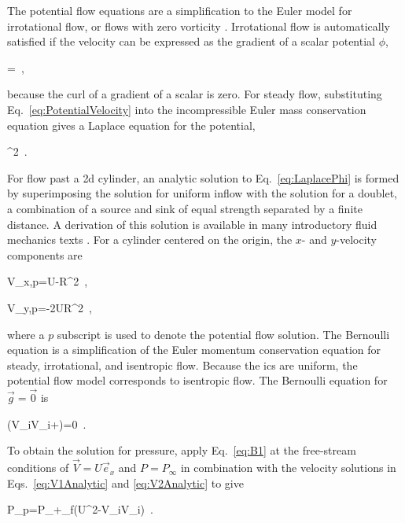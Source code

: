 The potential flow equations are a simplification to the Euler model for irrotational flow, or flows with zero vorticity \cite{munson,hirsch}. Irrotational flow is automatically satisfied if the velocity can be expressed as the gradient of a scalar potential \(\phi\),

\beq
\label{eq:PotentialVelocity}
=\nabla\phi\ ,
\eeq

\noindent because the curl of a gradient of a scalar is zero. For steady flow, substituting Eq.\ \eqref{eq:PotentialVelocity} into the incompressible Euler mass conservation equation gives a Laplace equation for the potential,

\beq
\label{eq:LaplacePhi}
\nabla^2\ .
\eeq

\noindent For flow past a \gls{2d} cylinder, an analytic solution to Eq.\ \eqref{eq:LaplacePhi} is formed by superimposing the solution for uniform inflow with the solution for a doublet, a combination of a source and sink of equal strength separated by a finite distance. A derivation of this solution is available in many introductory fluid mechanics texts \cite{munson}. For a cylinder centered on the origin, the \(x\)- and \(y\)-velocity components are

\beq
\label{eq:V1Analytic}
V_{x,p}=U\left{}-R^2\right\rbrack\ ,
\eeq

\beq
\label{eq:V2Analytic}
V_{y,p}=-2UR^2\ ,
\eeq

\noindent where a \(p\) subscript is used to denote the potential flow solution. The Bernoulli equation is a simplification of the Euler momentum conservation equation for steady, irrotational, and isentropic flow. Because the \glspl{ic} are uniform, the potential flow model corresponds to isentropic flow. The Bernoulli equation for \(\vec{g}=\vec{0}\) is

\beq
\label{eq:B1}
\nabla\left(V_iV_i+\right)=0\ .
\eeq

\noindent To obtain the solution for pressure, apply Eq.\ \eqref{eq:B1} at the free-stream conditions of \(\vec{V}=U\vec{e}_x\) and \(P=P_\infty\) in combination with the velocity solutions in Eqs.\ \eqref{eq:V1Analytic} and \eqref{eq:V2Analytic} to give

\beq
\label{eq:PPressure}
P_p=P_\infty+\rho_f\left(U^2-V_iV_i\right)\ .
\eeq

